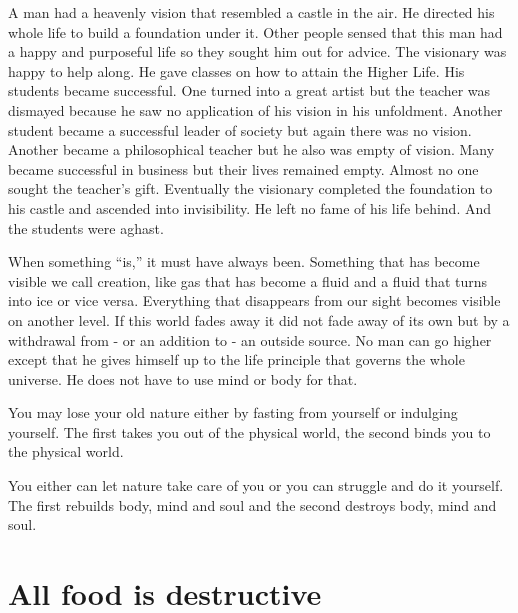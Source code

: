 \documentclass[landscape,twocolumn,letterpaper]{article}
\begin{document}
A man had a heavenly vision that resembled a castle in the air. He
directed his whole life to build a foundation under it. Other people
sensed that this man had a happy and purposeful life so they sought
him out for advice. The visionary was happy to help along. He gave
classes on how to attain the Higher Life. His students became
successful. One turned into a great artist but the teacher was
dismayed because he saw no application of his vision in his
unfoldment. Another student became a successful leader of society but
again there was no vision. Another became a philosophical teacher but
he also was empty of vision. Many became successful in business but
their lives remained empty. Almost no one sought the teacher's
gift. Eventually the visionary completed the foundation to his castle
and ascended into invisibility. He left no fame of his life
behind. And the students were aghast.

When something ``is,'' it must have always been. Something that has
become visible we call creation, like gas that has become a fluid and
a fluid that turns into ice or vice versa. Everything that disappears
from our sight becomes visible on another level. If this world fades
away it did not fade away of its own but by a withdrawal from - or an
addition to - an outside source. No man can go higher except that he
gives himself up to the life principle that governs the whole
universe. He does not have to use mind or body for that.

You may lose your old nature either by fasting from yourself or
indulging yourself. The first takes you out of the physical world, the
second binds you to the physical world.

You either can let nature take care of you or you can struggle and do
it yourself. The first rebuilds body, mind and soul and the second
destroys body, mind and soul.


\section{All food is destructive}
\label{sec:afid}
\end{document}
